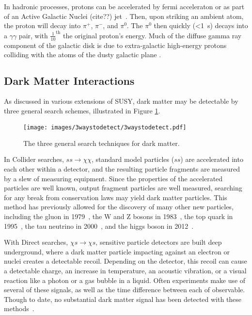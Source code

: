   In hadronic processes, protons can be accelerated by fermi acceleraton or as part of an {\color{red}Active Galactic Nuclei (cite??)} jet~\cite{hadronic1,hadronic2}.
  Then, upon striking an ambient atom, the proton will decay into $\pi^{+}$, $\pi^{-}$, and $\pi^{0}$.
  The $\pi^{0}$ then quickly (<\SI{1}{s}) decays into a $\gamma\gamma$ pair, with \nicetilde $\frac{1}{10}^{\text{th}}$ the original proton's energy.
  Much of the diffuse gamma ray component of the galactic disk is due to extra-galactic high-energy protons colliding with the atoms of the dusty galactic plane \cite{GalacticDiffuseGammaRays}.

  \subsection{Dark Matter Interactions}\label{dmgammaproduction}
    As discussed in various extensions of SUSY, dark matter may be detectable by three general search schemes, illustrated in Figure \ref{fig:3_searches}.

    \begin{figure}[ht]
      \centering
      \texttt{[image: images/3waystodetect/3waystodetect.pdf]}
      \caption[3 Search Techniques]{
        The three general search techniques for dark matter.}
      \label{fig:3_searches}
    \end{figure}

    In Collider searches, $ss \rightarrow \chi\chi$, standard model particles ($ss$) are accelerated into each other within a detector, and the resulting particle fragments are measured by a slew of measuring equipment.
    Since the properties of the accelerated particles are well known, output fragment particles are well measured, searching for any break from conservation laws may yield dark matter particles.
    This method has previously allowed for the discovery of many other new particles, including the gluon in 1979~\cite{gluon_discovery}, the W and Z bosons in 1983~\cite{WZ_discovery1,WZ_discovery2}, the top quark in 1995~\cite{top_discovery}, the tau neutrino in 2000~\cite{tau_neutrino_discovery}, and the higgs boson in 2012~\cite{Higgs_ATLAS,Higgs_CMS}.

    With Direct searches, $\chi s \rightarrow \chi s$, sensitive particle detectors are built deep underground, where a dark matter particle impacting against an electron or nuclei creates a detectable recoil.
    Depending on the detector, this recoil can cause a detectable charge, an increase in temperature, an acoustic vibration, or a visual reaction like a photon or a gas bubble in a liquid.
    Often experiments make use of several of these signals, as well as the time difference between each of observable.
    Though to date, no substantial dark matter signal has been detected with these methods~\cite{direct_dm_detection}.


